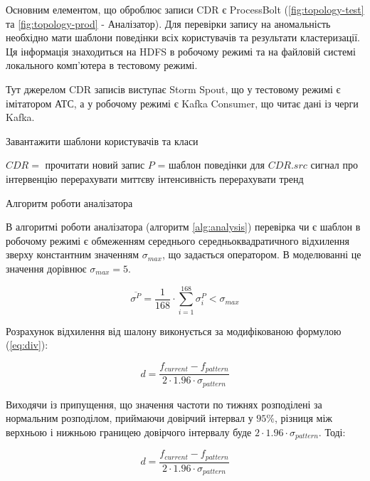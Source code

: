 Основним елементом, що оброблює записи CDR є ProcessBolt (\autoref{fig:topology-test} та \autoref{fig:topology-prod} - Аналізатор). Для перевірки запису на аномальність необхідно мати шаблони поведінки всіх користувачів та результати кластеризації. Ця інформація знаходиться на HDFS в робочому режимі та на файловій системі локального комп'ютера в тестовому режимі.

Тут джерелом CDR записів виступає Storm Spout, що у тестовому режимі є імітатором АТС, а у робочому режимі є Kafka Consumer, що читає дані із черги Kafka.

\begin{algorithm}[h]
  Завантажити шаблони користувачів та класи\;
  
   {
    $CDR = $ прочитати новий запис\;
    $P$ = шаблон поведінки для $CDR.src$\;
     {
       {
        сигнал про інтервенцію\;
       }
    }
   перерахувати миттєву інтенсивність\;
   перерахувати тренд\;
  }
\caption{Алгоритм роботи аналізатора}
\label{alg:analysis}
\end{algorithm}

В алгоритмі роботи аналізатора (алгоритм \ref{alg:analysis}) перевірка чи є шаблон в робочому режимі є обмеженням середнього середньоквадратичного відхилення зверху константним значенням $\sigma_{max}$, що задається оператором. В моделюванні це значення дорівнює $\sigma_{max} = 5$.

\begin{equation}\label{eq:isConverged} \overline{\sigma^P} = \frac{1}{168} \cdot \sum_{i=1}^{168}{\sigma^P_i} < \sigma_{max} \end{equation}

Розрахунок відхилення від шалону виконується за модифікованою формулою (\ref{eq:div}):

\begin{equation}\label{eq:deviation_real} d = \frac{f_{current} - f_{pattern}}{2 \cdot 1.96 \cdot \sigma_{pattern}} \end{equation}

Виходячи із припущення, що значення частоти по тижнях розподілені за нормальним розподілом, приймаючи довірчий інтервал у $95\%$, різниця між верхньою і нижньою границею довірчого інтервалу буде $2 \cdot 1.96 \cdot \sigma_{pattern}$. Тоді:

\begin{equation}\label{eq:deviation_real} d = \frac{f_{current} - f_{pattern}}{2 \cdot 1.96 \cdot \sigma_{pattern}} \end{equation}

